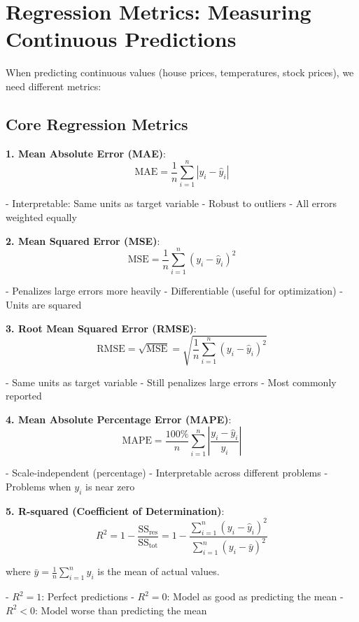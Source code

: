 \documentclass{article}
\begin{document}
\section{Regression Metrics: Measuring Continuous Predictions}

When predicting continuous values (house prices, temperatures, stock prices), we need different metrics:

\subsection{Core Regression Metrics}

\textbf{1. Mean Absolute Error (MAE)}:
$$\text{MAE} = \frac{1}{n} \sum_{i=1}^n |y_i - \hat{y}_i|$$

- Interpretable: Same units as target variable
- Robust to outliers
- All errors weighted equally

\textbf{2. Mean Squared Error (MSE)}:
$$\text{MSE} = \frac{1}{n} \sum_{i=1}^n (y_i - \hat{y}_i)^2$$

- Penalizes large errors more heavily
- Differentiable (useful for optimization)
- Units are squared

\textbf{3. Root Mean Squared Error (RMSE)}:
$$\text{RMSE} = \sqrt{\text{MSE}} = \sqrt{\frac{1}{n} \sum_{i=1}^n (y_i - \hat{y}_i)^2}$$

- Same units as target variable
- Still penalizes large errors
- Most commonly reported

\textbf{4. Mean Absolute Percentage Error (MAPE)}:
$$\text{MAPE} = \frac{100\%}{n} \sum_{i=1}^n \left|\frac{y_i - \hat{y}_i}{y_i}\right|$$

- Scale-independent (percentage)
- Interpretable across different problems
- Problems when $y_i$ is near zero

\textbf{5. R-squared (Coefficient of Determination)}:
$$R^2 = 1 - \frac{\text{SS}_{\text{res}}}{\text{SS}_{\text{tot}}} = 1 - \frac{\sum_{i=1}^n (y_i - \hat{y}_i)^2}{\sum_{i=1}^n (y_i - \bar{y})^2}$$

where $\bar{y} = \frac{1}{n}\sum_{i=1}^n y_i$ is the mean of actual values.

- $R^2 = 1$: Perfect predictions
- $R^2 = 0$: Model as good as predicting the mean
- $R^2 < 0$: Model worse than predicting the mean
\end{document}
